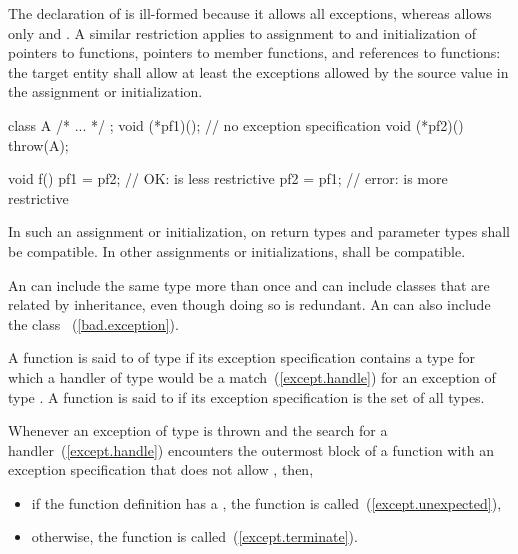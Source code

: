 The declaration of
is ill-formed because it allows all exceptions, whereas
allows only
and
.
\exitexample
A similar restriction applies to assignment to and
initialization of pointers to functions, pointers
to member functions, and references to functions:
the target entity shall allow at least the exceptions
allowed by the source value in the assignment or
initialization.
\enterexample
\begin{codeblock}
class A { /* ... */ };
void (*pf1)();      // no exception specification
void (*pf2)() throw(A);

void f() {
  pf1 = pf2;        // OK:  is less restrictive
  pf2 = pf1;        // error:  is more restrictive
}
\end{codeblock}
\exitexample

\pnum
In such an assignment or initialization,
on return types and parameter types shall be compatible.
In other assignments or initializations,
shall be compatible.

\pnum
An
can include the same type more than once
and can include classes that are related by inheritance,
even though doing so is redundant.
\enternote An
can also include the class
~(\ref{bad.exception}).
\exitnote

\pnum
{}%
A function is said to
of type
if
its exception specification
contains a type
for which a handler of type
would be a match~(\ref{except.handle}) for an exception of type
.
%
A function is said to 
if its exception specification
is the set of all types.

\pnum
{}%
%
Whenever an exception of type  is thrown
and the search for a handler~(\ref{except.handle})
encounters the outermost block of a function with an
exception specification that does not allow , then,

\begin{itemize}
\item if the function definition has a
, the function
 is called~(\ref{except.unexpected}),

%
%
\item otherwise, the function  is called~(\ref{except.terminate}).
\end{itemize}

